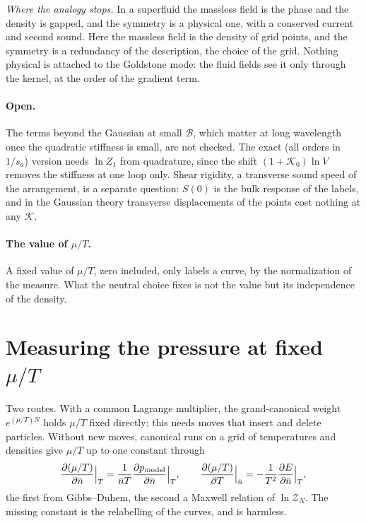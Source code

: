 \documentclass[11pt,aps,preprint,nofootinbib,superscriptaddress,tightenlines]{revtex4-2}
\def\st{\begin{equation}}
\def\stp{\end{equation}}
\let\oldparagraph\paragraph
\renewcommand{\paragraph}{\par\bigskip\oldparagraph}
\begin{document}
\emph{Where the analogy stops.}  In a superfluid the massless field is the phase and the density is gapped, and the symmetry is a physical one, with a conserved
current and second sound.  Here the massless field is the density of grid points, and the symmetry is a redundancy of the description, the choice of the grid.
Nothing physical is attached to the Goldstone mode: the fluid fields see it only through the kernel, at the order of the gradient term.

\paragraph{Open.}  The terms beyond the Gaussian at small $\mathcal B$, which matter at long wavelength once the quadratic stiffness is small, are not
checked.  The exact (all orders in $1/s_a$) version needs $\ln Z_1$ from quadrature, since the shift $(1+\mathcal K_0)\ln V$ removes the stiffness at one loop only.
Shear rigidity, a transverse sound speed of the arrangement, is a separate question: $S(0)$ is the bulk response of the labels, and in the Gaussian theory
transverse displacements of the points cost nothing at any $\mathcal K$.

\paragraph{The value of $\mu/T$.}  A fixed value of $\mu/T$, zero included, only labels a curve, by the normalization of the measure.  What the neutral choice
fixes is not the value but its independence of the density.

\section{Measuring the pressure at fixed $\mu/T$}
\label{sec:measureP}

Two routes.  With a common Lagrange multiplier, the grand-canonical weight $e^{(\mu/T)N}$ holds $\mu/T$ fixed directly; this needs moves that insert and delete
particles.  Without new moves, canonical runs on a grid of temperatures and densities give $\mu/T$ up to one constant through
\st
\frac{\partial(\mu/T)}{\partial\bar n}\Big|_T=\frac1{\bar nT}\frac{\partial p_{\rm model}}{\partial\bar n}\Big|_T,\qquad
\frac{\partial(\mu/T)}{\partial T}\Big|_{\bar n}=-\frac1{T^2}\frac{\partial E}{\partial\bar n}\Big|_T ,
\label{maxwell}
\stp
the first from Gibbs--Duhem, the second a Maxwell relation of $\ln\mathcal Z_N$.  The missing constant is the relabelling of the curves, and is harmless.
\end{document}
